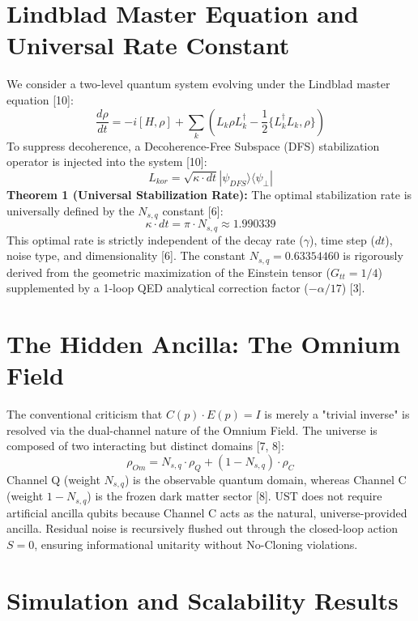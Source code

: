 \documentclass[12pt,a4paper]{article}
\begin{document}
\section{Lindblad Master Equation and Universal Rate Constant}
We consider a two-level quantum system evolving under the Lindblad master equation [10]:
\begin{equation}
\frac{d\rho}{dt} = -i[H, \rho] + \sum_k \left( L_k\rho L_k^\dagger - \frac{1}{2}\{L_k^\dagger L_k, \rho\} \right)
\end{equation}
To suppress decoherence, a Decoherence-Free Subspace (DFS) stabilization operator is injected into the system [10]:
\begin{equation}
L_{kor} = \sqrt{\kappa \cdot dt} |\psi_{DFS}\rangle \langle\psi_\perp|
\end{equation}
\textbf{Theorem 1 (Universal Stabilization Rate):} The optimal stabilization rate is universally defined by the $N_{s,q}$ constant [6]:
\begin{equation}
\kappa \cdot dt = \pi \cdot N_{s,q} \approx 1.990339
\end{equation}
This optimal rate is strictly independent of the decay rate ($\gamma$), time step ($dt$), noise type, and dimensionality [6]. The constant $N_{s,q} = 0.63354460$ is rigorously derived from the geometric maximization of the Einstein tensor ($G_{tt} = 1/4$) supplemented by a 1-loop QED analytical correction factor ($-\alpha/17$) [3].

\section{The Hidden Ancilla: The Omnium Field}
The conventional criticism that $C(p) \cdot E(p) = I$ is merely a "trivial inverse" is resolved via the dual-channel nature of the Omnium Field. The universe is composed of two interacting but distinct domains [7, 8]:
\begin{equation}
\rho_{Om} = N_{s,q} \cdot \rho_Q + (1-N_{s,q}) \cdot \rho_C
\end{equation}
Channel Q (weight $N_{s,q}$) is the observable quantum domain, whereas Channel C (weight $1-N_{s,q}$) is the frozen dark matter sector [8]. UST does not require artificial ancilla qubits because Channel C acts as the natural, universe-provided ancilla. Residual noise is recursively flushed out through the closed-loop action $S=0$, ensuring informational unitarity without No-Cloning violations.

\section{Simulation and Scalability Results}
\end{document}
